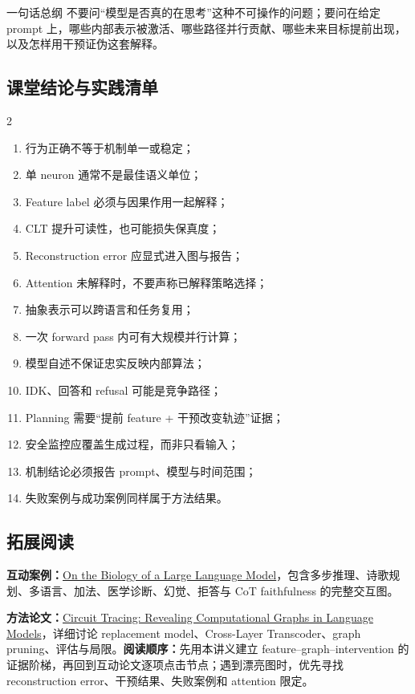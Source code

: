 \documentclass[a4paper]{article}
\begin{document}
\begin{importantbox}{一句话总纲}
不要问“模型是否真的在思考”这种不可操作的问题；要问在给定 prompt 上，哪些内部表示被激活、哪些路径并行贡献、哪些未来目标提前出现，以及怎样用干预证伪这套解释。
\end{importantbox}

\subsection{课堂结论与实践清单}

\small
\begin{multicols}{2}
\begin{enumerate}
  \item 行为正确不等于机制单一或稳定；
  \item 单 neuron 通常不是最佳语义单位；
  \item Feature label 必须与因果作用一起解释；
  \item CLT 提升可读性，也可能损失保真度；
  \item Reconstruction error 应显式进入图与报告；
  \item Attention 未解释时，不要声称已解释策略选择；
  \item 抽象表示可以跨语言和任务复用；
  \item 一次 forward pass 内可有大规模并行计算；
  \item 模型自述不保证忠实反映内部算法；
  \item IDK、回答和 refusal 可能是竞争路径；
  \item Planning 需要“提前 feature + 干预改变轨迹”证据；
  \item 安全监控应覆盖生成过程，而非只看输入；
  \item 机制结论必须报告 prompt、模型与时间范围；
  \item 失败案例与成功案例同样属于方法结果。
\end{enumerate}
\end{multicols}
\normalsize

\enlargethispage{4\baselineskip}
\subsection{拓展阅读}

\small
\noindent\textbf{互动案例：}\href{https://transformer-circuits.pub/2025/attribution-graphs/biology.html}{On the Biology of a Large Language Model}，包含多步推理、诗歌规划、多语言、加法、医学诊断、幻觉、拒答与 CoT faithfulness 的完整交互图。

\noindent\textbf{方法论文：}\href{https://transformer-circuits.pub/2025/attribution-graphs/methods.html}{Circuit Tracing: Revealing Computational Graphs in Language Models}，详细讨论 replacement model、Cross-Layer Transcoder、graph pruning、评估与局限。\textbf{阅读顺序：}先用本讲义建立 feature--graph--intervention 的证据阶梯，再回到互动论文逐项点击节点；遇到漂亮图时，优先寻找 reconstruction error、干预结果、失败案例和 attention 限定。
\normalsize
\end{document}
